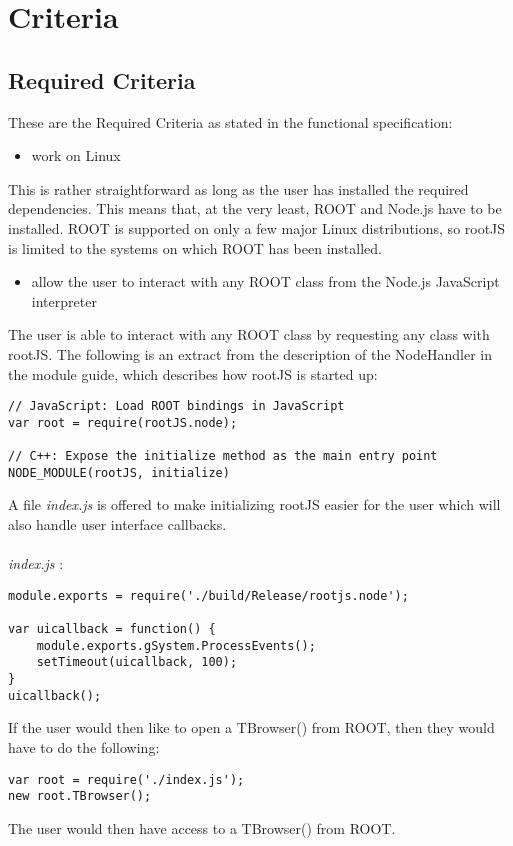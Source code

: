 \chapter{Criteria}
\section{Required Criteria}
These are the Required Criteria as stated in the functional specification:
\begin{itemize}
	\item work on Linux
\end{itemize}
	This is rather straightforward as long as the user has installed the required dependencies. 
	This means that, at the very least, ROOT and Node.js have to be installed. 
	ROOT is supported on only a few major Linux distributions, so rootJS is limited to the systems
	on which ROOT has been installed.
	
\begin{itemize}
	\item allow the user to interact with any ROOT class from the Node.js JavaScript interpreter
\end{itemize}
	The user is able to interact with any ROOT class by requesting any class with rootJS. The following is an extract from the description of the NodeHandler	in the module guide, which describes how rootJS is started up:
\begin{verbatim}
// JavaScript: Load ROOT bindings in JavaScript
var root = require(rootJS.node);

// C++: Expose the initialize method as the main entry point
NODE_MODULE(rootJS, initialize)
\end{verbatim}
	A file \textit{index.js} is offered to make initializing rootJS easier for the user 
	which will also handle user interface callbacks. \\
	\\
	\textit{index.js} :
\begin{verbatim}	
module.exports = require('./build/Release/rootjs.node');

var uicallback = function() {
	module.exports.gSystem.ProcessEvents();
	setTimeout(uicallback, 100);
}
uicallback();
\end{verbatim}
	If the user would then like to open a TBrowser() from ROOT, then they would have to do the following: 
\begin{verbatim}
var root = require('./index.js');
new root.TBrowser();
\end{verbatim}
	The user would then have access to a  TBrowser() from ROOT. 
	
